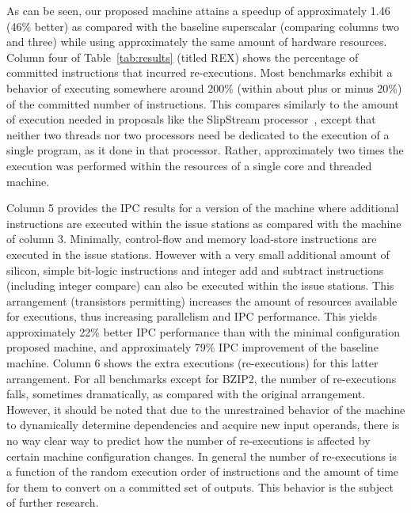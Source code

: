 \documentclass[10pt,twocolumn,dvips]{article}
\begin{document}
%
As can be seen, our proposed machine attains a speedup of approximately
1.46 (46\% better) as compared with the baseline superscalar 
(comparing columns two and three) 
while using approximately the same amount of hardware resources.
Column four of Table~\ref{tab:results} (titled REX) shows the percentage
of committed instructions that incurred re-executions.
Most benchmarks exhibit a behavior of executing somewhere around
200\% (within about plus or minus 20\%) of the committed
number of instructions.
This compares similarly to the amount of execution needed
in proposals like the SlipStream processor~\cite{ibrahim03},
except that neither two threads nor two processors need be
dedicated to the execution of a single program, as it done in
that processor. 
Rather, approximately two times the execution was performed
within the resources of a single core and threaded machine.

Column 5 provides the IPC results for a version of the
machine where additional instructions are executed within
the issue stations as compared with the machine of column 3.
Minimally, control-flow and memory load-store instructions
are executed in the issue stations.  
However with a very small additional amount of silicon,
simple bit-logic instructions and integer add and subtract
instructions (including integer compare) can also 
be executed within the issue stations.
This arrangement (transistors permitting) increases the
amount of resources available for executions, thus increasing
parallelism and IPC performance.
This yields approximately 22\% better IPC performance
than with the minimal configuration proposed machine, and approximately
79\% IPC improvement of the baseline machine.
Column 6 shows the extra executions (re-executions) for
this latter arrangement.
For all benchmarks except for BZIP2, the number of re-executions
falls, sometimes dramatically, as compared with the original
arrangement.
However, it should be noted that due to the unrestrained
behavior of the machine to dynamically determine dependencies
and acquire new input operands, there is no way clear way to predict how
the number of re-executions is affected by certain machine
configuration changes.
In general the number of re-executions is a function of
the random execution order of instructions and the amount of
time for them to convert on a committed set of outputs.
This behavior is the subject of further research.
%
%
\vspace{-0.15in}
\end{document}
